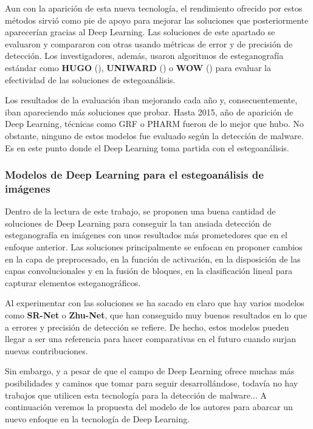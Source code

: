 Aun con la aparición de esta nueva tecnología, el rendimiento ofrecido por estos métodos sirvió como pie de apoyo para mejorar las soluciones que posteriormente aparecerían gracias al Deep Learning. Las soluciones de este apartado se evaluaron y compararon con otras usando métricas de error y de precisión de detección. Los investigadores, además, usaron algoritmos de esteganografía estándar como \textbf{HUGO} (\cite{hugo}), \textbf{UNIWARD} (\cite{uniward}) o \textbf{WOW} (\cite{wow}) para evaluar la efectividad de las soluciones de estegoanálisis.%

Los resultados de la evaluación iban mejorando cada año y, consecuentemente, iban apareciendo más soluciones que probar. Hasta 2015, año de aparición de Deep Learning, técnicas como GRF o PHARM fueron de lo mejor que hubo. No obstante, ninguno de estos modelos fue evaluado según la detección de malware. Es en este punto donde el Deep Learning toma partida con el estegoanálisis.

\subsubsection{Modelos de Deep Learning para el estegoanálisis de imágenes}

Dentro de la lectura de este trabajo, se proponen una buena cantidad de soluciones de Deep Learning para conseguir la tan ansiada detección de esteganografía en imágenes con unos resultados más prometedores que en el enfoque anterior. Las soluciones principalmente se enfocan en proponer cambios en la capa de preprocesado, en la función de activación, en la disposición de las capas convolucionales y en la fusión de bloques, en la clasificación lineal para capturar elementos esteganográficos.

Al experimentar con las soluciones se ha sacado en claro que hay varios modelos como \textbf{SR-Net} o \textbf{Zhu-Net}, que han conseguido muy buenos resultados en lo que a errores y precisión de detección se refiere. De hecho, estos modelos pueden llegar a ser una referencia para hacer comparativas en el futuro cuando surjan nuevas contribuciones.

Sin embargo, y a pesar de que el campo de Deep Learning ofrece muchas más posibilidades y caminos que tomar para seguir desarrollándose, todavía no hay trabajos que utilicen esta tecnología para la detección de malware... A continuación veremos la propuesta del modelo de los autores para abarcar un nuevo enfoque en la tecnología de Deep Learning.

